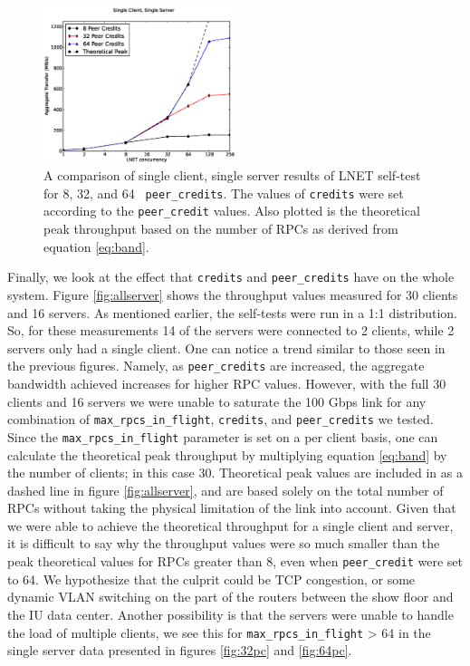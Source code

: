 \documentclass[]{sigplan-proc}
\begin{document}
\begin{figure}
\centering
\includegraphics[width=0.50\textwidth]{figures/ss_plot.eps}
\caption{A comparison of single client, single server results of LNET self-test for 8, 32, and 64 {\tt
    peer\_credits}. The values of {\tt credits} were set according to the {\tt peer\_credit} values. Also
  plotted is the theoretical peak throughput based on the number of RPCs as derived from equation \ref{eq:band}.}
\label{fig:singleserver}
\end{figure}

Finally, we look at the effect that {\tt credits} and {\tt peer\_credits} have on the whole system. Figure
\ref{fig:allserver} shows the throughput values measured for 30 clients and 16 servers. As mentioned earlier,
the self-tests were run in a 1:1 distribution. So, for these measurements 14 of the servers were connected to
2 clients, while 2 servers only had a single client. One can notice a trend similar to those seen in the
previous figures. Namely, as {\tt peer\_credits} are increased, the aggregate bandwidth achieved increases for
higher RPC values. However, with the full 30 clients and 16 servers we were unable to saturate the 100 Gbps
link for any combination of {\tt max\_rpcs\_in\_flight}, {\tt credits}, and {\tt peer\_credits} we tested. Since the {\tt max\_rpcs\_in\_flight} parameter is set on a per client basis, one can
calculate the theoretical peak throughput by multiplying equation \ref{eq:band} by the number of clients; in
this case 30. Theoretical peak values are included in as a dashed line in figure \ref{fig:allserver}, and are
based solely on the total number of RPCs without taking the physical limitation of the link into
account. Given that we were able to achieve the theoretical throughput for a single client and server, it is
difficult to say why the throughput values were so much smaller than the peak theoretical values for RPCs
greater than 8, even when {\tt peer\_credit} were set to 64. We hypothesize that the culprit could be TCP
congestion, or some dynamic VLAN switching on the part of the routers between the show floor and the IU data
center. Another possibility is that the servers were unable to handle the load of multiple clients, we see
this for {\tt max\_rpcs\_in\_flight} > 64 in the single server data presented in figures \ref{fig:32pc} and \ref{fig:64pc}.  
\end{document}
